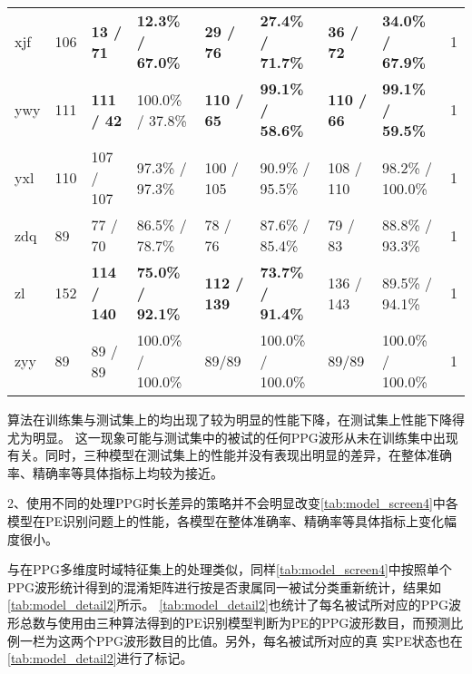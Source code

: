 \begin{landscape}
\begin{longtable}{m{2cm}<{\centering}m{2cm}<{\centering}m{2cm}<{\centering}m{2cm}<{\centering}m{2cm}<{\centering}m{2cm}<{\centering}m{2cm}<{\centering}m{2cm}<{\centering}m{2cm}<{\centering}}
            xjf                   & 106                   & \textbf{13 / 71}         & \textbf{12.3\% / 67.0\%}     & \textbf{29 / 76}         & \textbf{27.4\% / 71.7\%}    & \textbf{36 / 72}         & \textbf{34.0\% / 67.9\%}       & 1                                                                      \\
            ywy                   & 111                   & \textbf{111 / 42}        & 100.0\% / 37.8\%     & \textbf{110 / 65}        & \textbf{99.1\% / 58.6\%}    & \textbf{110 / 66}        & \textbf{99.1\% / 59.5\%}    & 1                                                                      \\
            yxl                   & 110                   & 107 / 107        & 97.3\% / 97.3\%   & 100 / 105        & 90.9\% / 95.5\%    & 108 / 110        & 98.2\% / 100.0\%     & 1                                                                      \\
            zdq                   & 89                    & 77 / 70         & 86.5\% / 78.7\%     & 78 / 76         & 87.6\% / 85.4\%     & 79 / 83         & 88.8\% / 93.3\%      & 1                                                                      \\
            zl                    & 152                   & \textbf{114 / 140}        & \textbf{75.0\% / 92.1\%}     & \textbf{112 / 139}         & \textbf{73.7\% / 91.4\%}     & 136 / 143        & 89.5\% / 94.1\%      & 1                                                                      \\
            zyy                   & 89                    & 89 / 89         & 100.0\% / 100.0\%    & 89/89         & 100.0\% / 100.0\%    & 89/89         & 100.0\% / 100.0\%    & 1                                                                       \\    
      \end{longtable}
\end{landscape}
\noindent
算法在训练集与测试集上的均出现了较为明显的性能下降，在测试集上性能下降得尤为明显。
这一现象可能与测试集中的被试的任何PPG波形从未在训练集中出现有关。同时，三种模型在测试集上的性能并没有表现出明显的差异，在整体准确率、精确率等具体指标上均较为接近。

2、使用不同的处理PPG时长差异的策略并不会明显改变\autoref{tab:model_screen4}中各模型在PE识别问题上的性能，各模型在整体准确率、精确率等具体指标上变化幅度很小。

与在PPG多维度时域特征集上的处理类似，同样\autoref{tab:model_screen4}中按照单个PPG波形统计得到的混淆矩阵进行按是否隶属同一被试分类重新统计，结果如\autoref{tab:model_detail2}所示。
\autoref{tab:model_detail2}也统计了每名被试所对应的PPG波形总数与使用由三种算法得到的PE识别模型判断为PE的PPG波形数目，而预测比例一栏为这两个PPG波形数目的比值。另外，每名被试所对应的真
实PE状态也在\autoref{tab:model_detail2}进行了标记。

